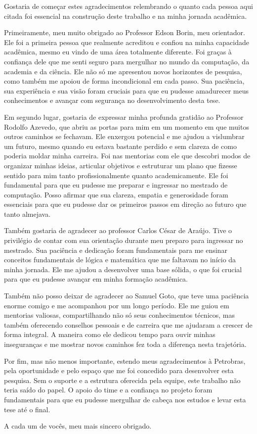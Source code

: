 Gostaria de começar estes agradecimentos relembrando o quanto cada pessoa aqui citada foi essencial na construção deste trabalho e na minha jornada acadêmica.

Primeiramente, meu muito obrigado ao Professor Edson Borin, meu orientador.
Ele foi a primeira pessoa que realmente acreditou e confiou na minha capacidade acadêmica, mesmo eu vindo de uma área totalmente diferente.
Foi graças à confiança dele que me senti seguro para mergulhar no mundo da computação, da academia e da ciência.
Ele não só me apresentou novos horizontes de pesquisa, como também me apoiou de forma incondicional em cada passo.
Sua paciência, sua experiência e sua visão foram cruciais para que eu pudesse amadurecer meus conhecimentos e avançar com segurança no desenvolvimento desta tese.

Em segundo lugar, gostaria de expressar minha profunda gratidão ao Professor Rodolfo Azevedo, que abriu as portas para mim em um momento em que muitos outros caminhos se fechavam.
Ele enxergou potencial e me ajudou a vislumbrar um futuro, mesmo quando eu estava bastante perdido e sem clareza de como poderia moldar minha carreira.
Foi nas mentorias com ele que descobri modos de organizar minhas ideias, articular objetivos e estruturar um plano que fizesse sentido para mim tanto profissionalmente quanto academicamente.
Ele foi fundamental para que eu pudesse me preparar e ingressar no mestrado de computação.
Posso afirmar que sua clareza, empatia e generosidade foram essenciais para que eu pudesse dar os primeiros passos em direção ao futuro que tanto almejava.

Também gostaria de agradecer ao professor Carlos César de Araújo.
Tive o privilégio de contar com sua orientação durante meu preparo para ingressar no mestrado.
Sua paciência e dedicação foram fundamentais para me ensinar conceitos fundamentais de lógica e matemática que me faltavam no início da minha jornada.
Ele me ajudou a desenvolver uma base sólida, o que foi crucial para que eu pudesse avançar em minha formação acadêmica.

Também não posso deixar de agradecer ao Samuel Goto, que teve uma paciência enorme comigo e me acompanhou por um longo período.
Ele me guiou em mentorias valiosas, compartilhando não só seus conhecimentos técnicos, mas também oferecendo conselhos pessoais e de carreira que me ajudaram a crescer de forma integral.
A maneira como ele dedicou tempo para ouvir minhas inseguranças e me mostrar novos caminhos fez toda a diferença nesta trajetória.

Por fim, mas não menos importante, estendo meus agradecimentos à Petrobras, pela oportunidade e pelo espaço que me foi concedido para desenvolver esta pesquisa.
Sem o suporte e a estrutura oferecida pela equipe, este trabalho não teria saído do papel.
O apoio do time e a confiança no projeto foram fundamentais para que eu pudesse mergulhar de cabeça nos estudos e levar esta tese até o final.

A cada um de vocês, meu mais sincero obrigado.